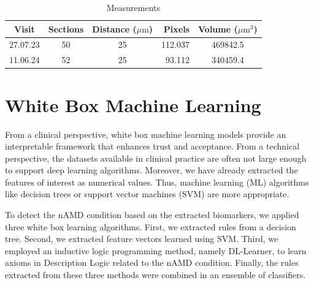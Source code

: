\documentclass[conference]{IEEEtran}
\begin{document}
\begin{table}%
    \centering
    \caption{Measurements}
    \label{tab:volume}
    \begin{tabular}{c|c|c|r|c}
        \textbf{Visit} & \textbf{Sections} & \textbf{Distance (\(\mu\text{m}\))} & \textbf{Pixels} & \textbf{Volume (\(\mu\text{m}^3\))} \\ \hline
        27.07.23 & 50 & 25  & 112.037 & 469842.5 \\
        11.06.24 & 52 & 25  & 93.112  & 340459.4 \\ \hline
    \end{tabular}
\end{table}


\section{White Box Machine Learning}

From a clinical perspective, white box machine learning models provide an interpretable framework that enhances trust and acceptance. From a technical perspective, the datasets available in clinical practice are often not large enough to support deep learning algorithms. Moreover, we have already extracted the features of interest as numerical values. Thus, machine learning (ML) algorithms like decision trees or support vector machines (SVM) are more appropriate.

To detect the nAMD condition based on the extracted biomarkers, we applied three white box learning algorithms. First, we extracted rules from a decision tree. Second, we extracted feature vectors learned using SVM. 
Third, we employed an inductive logic programming method, namely DL-Learner, to learn axioms in Description Logic related to the nAMD condition. Finally, the rules extracted from these three methods were combined in an ensemble of classifiers.
\end{document}
